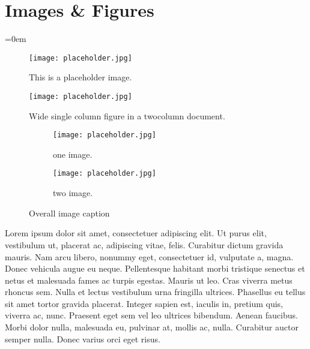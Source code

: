 
\section{Images \& Figures}
\label{sec:images_&_figures}
\parindent=0em

\lipsum[1]


\begin{figure}[h!]
  \texttt{[image: placeholder.jpg]}
  \caption{This is a placeholder image.}
  \label{fig:placeholder}
\end{figure}


\lipsum[1]


\begin{figure*}[ht]
\centering
\texttt{[image: placeholder.jpg]}
\caption{Wide single column figure in a twocolumn document.}
\end{figure*}


\lipsum


\begin{figure}[h!]
  \centering
  \begin{subfigure}[b]{0.4\linewidth}
    \texttt{[image: placeholder.jpg]}
    \caption{one image.}
  \end{subfigure}
  \begin{subfigure}[b]{0.4\linewidth}
    \texttt{[image: placeholder.jpg]}
    \caption{two image.}
  \end{subfigure}
  \caption{Overall image caption}
\end{figure}








Lorem ipsum dolor sit amet, consectetuer adipiscing elit. Ut purus elit,
vestibulum ut, placerat ac, adipiscing vitae, felis. Curabitur dictum gravida
mauris. Nam arcu libero, nonummy eget, consectetuer id, vulputate a, magna.
Donec vehicula augue eu neque. Pellentesque habitant morbi tristique senectus et
netus et malesuada fames ac turpis egestas. Mauris ut leo. Cras viverra metus
rhoncus sem. Nulla et lectus vestibulum urna fringilla ultrices. Phasellus eu
tellus sit amet tortor gravida placerat. Integer sapien est, iaculis in, pretium
quis, viverra ac, nunc. Praesent eget sem vel leo ultrices bibendum. Aenean
faucibus. Morbi dolor nulla, malesuada eu, pulvinar at, mollis ac, nulla.
Curabitur auctor semper nulla. Donec varius orci eget risus.


